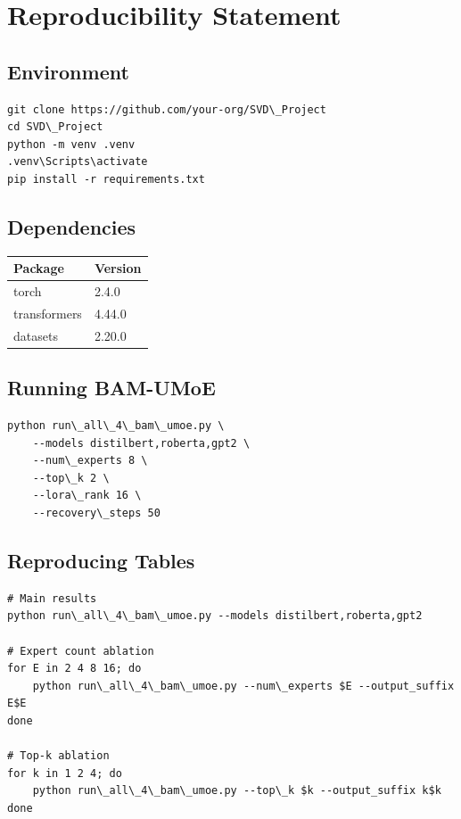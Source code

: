 \section{Reproducibility Statement}

\subsection{Environment}

\begin{lstlisting}
git clone https://github.com/your-org/SVD\_Project
cd SVD\_Project
python -m venv .venv
.venv\Scripts\activate
pip install -r requirements.txt
\end{lstlisting}

\subsection{Dependencies}

\begin{table}[H]
\centering
\small
\begin{tabular}{ll}
\toprule
\textbf{Package} & \textbf{Version} \\
\midrule
torch & 2.4.0 \\
transformers & 4.44.0 \\
datasets & 2.20.0 \\
\bottomrule
\end{tabular}
\end{table}

\subsection{Running BAM-UMoE}

\begin{lstlisting}
python run\_all\_4\_bam\_umoe.py \
    --models distilbert,roberta,gpt2 \
    --num\_experts 8 \
    --top\_k 2 \
    --lora\_rank 16 \
    --recovery\_steps 50
\end{lstlisting}

\subsection{Reproducing Tables}

\begin{lstlisting}
# Main results
python run\_all\_4\_bam\_umoe.py --models distilbert,roberta,gpt2

# Expert count ablation
for E in 2 4 8 16; do
    python run\_all\_4\_bam\_umoe.py --num\_experts $E --output_suffix E$E
done

# Top-k ablation
for k in 1 2 4; do
    python run\_all\_4\_bam\_umoe.py --top\_k $k --output_suffix k$k
done
\end{lstlisting}

